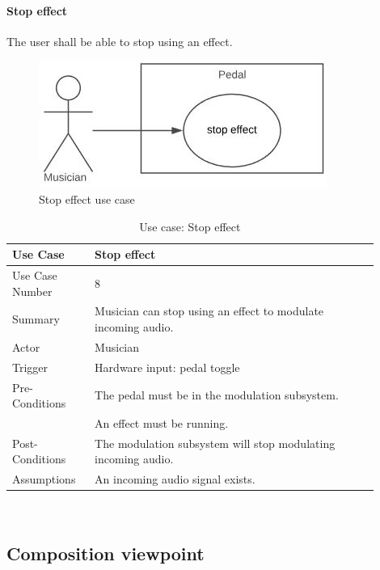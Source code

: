             \paragraph{Stop effect} 
            The user shall be able to stop using an effect.
            \begin{figure}[!ht]
                \centering
                \includegraphics[width=.5\textwidth]{diagrams/use_cases/uc-effect-stop.JPG}
                \caption{Stop effect use case}
                \label{fig:uc-stop-effect}
            \end{figure}
            \begin{table}[!ht]
                \centering
                \begin{tabular}{| p{0.2\linewidth} | p{0.7\linewidth} |}
                    \hline
                    Use Case & Stop effect \\
                    \hline \hline
                    Use Case Number & 8 \\ \hline
                    Summary & Musician can stop using an effect to modulate incoming audio. \\ \hline
                    Actor & Musician \\ \hline
                    Trigger & Hardware input: pedal toggle \\ \hline
                    Pre-Conditions & The pedal must be in the modulation subsystem. \\
                    & An effect must be running. \\ \hline
                    Post-Conditions & The modulation subsystem will stop modulating incoming audio. \\ \hline
                    Assumptions & An incoming audio signal exists.\\ \hline
                \end{tabular}
                \\
                \caption{Use case: Stop effect}
                \label{tab:uc-stop-effect}
            \end{table}
            
\clearpage
\subsection{Composition viewpoint}

